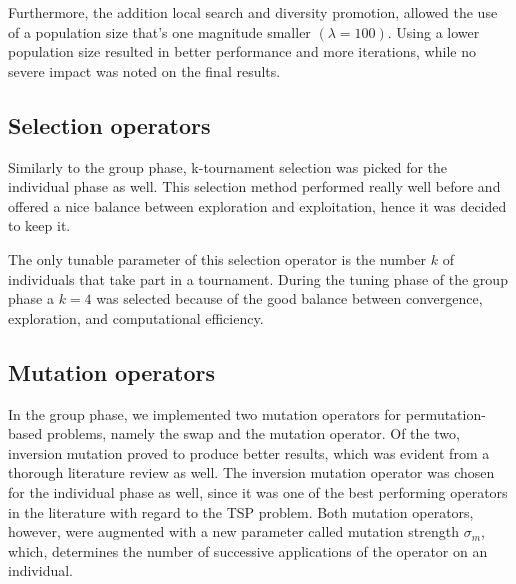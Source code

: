 \documentclass[a4paper,10pt]{article}
\newcommand{\ReplaceMe}[1]{{\color{blue}#1}}
\begin{document}
Furthermore, the addition local search and diversity promotion, allowed the use of a population size that's one magnitude smaller $(\lambda = 100)$. Using a lower population size resulted in better performance and more iterations, while no severe impact was noted on the final results.

\subsection{Selection operators}

Similarly to the group phase, k-tournament selection was picked for the individual phase as well. This selection method performed really well before and offered a nice balance between exploration and exploitation, hence it was decided to keep it.

The only tunable parameter of this selection operator is the number $k$ of individuals that take part in a tournament. During the tuning phase of the group phase a $k = 4$ was selected because of the good balance between convergence, exploration, and computational efficiency.

\subsection{Mutation operators} \label{ss_mut}


In the group phase, we implemented two mutation operators for permutation-based problems, namely the swap and the mutation operator. Of the two, inversion mutation proved to produce better results, which was evident from a thorough literature review as well. The inversion mutation operator was chosen for the individual phase as well, since it was one of the best performing operators in the literature with regard to the TSP problem. Both mutation operators, however, were augmented with a new parameter called mutation strength $\sigma_m$, which, determines the number of successive applications of the operator on an individual.
\end{document}
